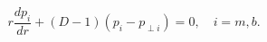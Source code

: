 \begin{equation}
r\frac{dp_i}{dr}+(D-1)(p_i-p_{\perp i})=0,\quad i=m,b.
\label{conteq}
\end{equation}

